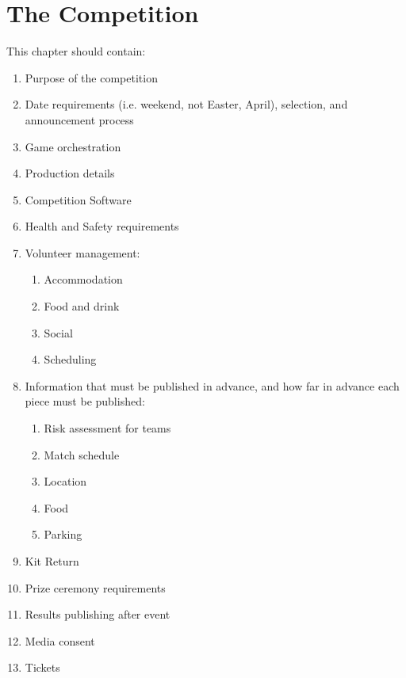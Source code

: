 \chapter{The Competition}

This chapter should contain:
\begin{enumerate}
\item Purpose of the competition
\item Date requirements (i.e. weekend, not Easter, April), selection, and announcement process

\item Game orchestration
\item Production details
\item Competition Software
\item Health and Safety requirements
\item Volunteer management:
  \begin{enumerate}
  \item Accommodation
  \item Food and drink
  \item Social
  \item Scheduling
  \end{enumerate}

\item Information that must be published in advance, and how far in advance each piece must be published:
  \begin{enumerate}
  \item Risk assessment for teams
  \item Match schedule
  \item Location
  \item Food
  \item Parking
  \end{enumerate}

\item Kit Return
\item Prize ceremony requirements
\item Results publishing after event
\item Media consent
\item Tickets
\end{enumerate}
